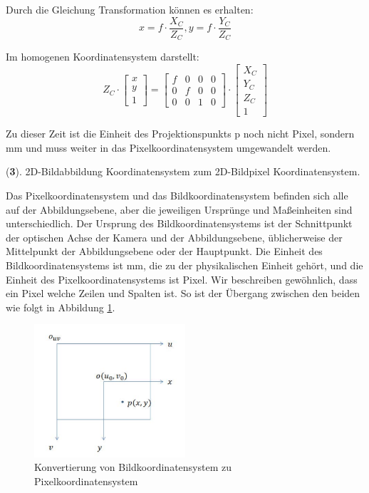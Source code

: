 Durch die Gleichung Transformation können es erhalten: 
\begin{equation}
   x = f \cdot \frac{X_C}{Z_C}, y = f \cdot \frac{Y_C}{Z_C}
\end{equation}

Im homogenen Koordinatensystem darstellt:
\begin{equation}
   Z_C \cdot \begin{bmatrix}
	x \\  
	y \\
	1
	\end{bmatrix} = \begin{bmatrix}
	f & 0 & 0 & 0	\\
	0 & f & 0 & 0	\\
	0 & 0 & 1 & 0	
	\end{bmatrix} \cdot \begin{bmatrix}
	X_C \\  
	Y_C \\
	Z_C \\
	1
	\end{bmatrix}
\end{equation}

Zu dieser Zeit ist die Einheit des Projektionspunkts p noch nicht Pixel, sondern mm und muss weiter in das Pixelkoordinatensystem umgewandelt werden.

(\textbf{3}). 2D-Bildabbildung Koordinatensystem zum 2D-Bildpixel Koordinatensystem.

Das Pixelkoordinatensystem und das Bildkoordinatensystem befinden sich alle auf der Abbildungsebene, aber die jeweiligen Ursprünge und Maßeinheiten sind unterschiedlich. Der Ursprung des Bildkoordinatensystems ist der Schnittpunkt der optischen Achse der Kamera und der Abbildungsebene, üblicherweise der Mittelpunkt der Abbildungsebene oder der Hauptpunkt. Die Einheit des Bildkoordinatensystems ist mm, die zu der physikalischen Einheit gehört, und die Einheit des Pixelkoordinatensystems ist Pixel. Wir beschreiben gewöhnlich, dass ein Pixel welche Zeilen und Spalten ist. So ist der Übergang zwischen den beiden wie folgt in Abbildung \ref{fig:Konvertierung von Pixelkoordinatensystem zu Bildkoordinatensystem}. 

\begin{figure}[H]
 \centering 
 \includegraphics[keepaspectratio,width=0.5\textwidth]{images/4_ZweiteErfahrung/Kamera/imagezupixel.pdf}
 \caption{Konvertierung von Bildkoordinatensystem zu Pixelkoordinatensystem}
 \label{fig:Konvertierung von Pixelkoordinatensystem zu Bildkoordinatensystem}
\end{figure} 

